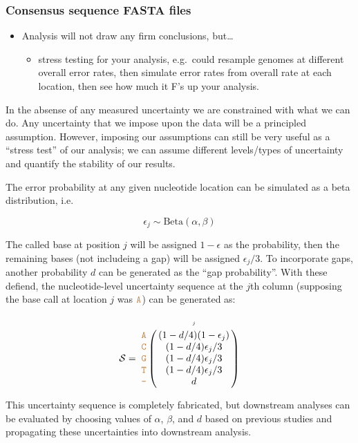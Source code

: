 \documentclass[
]{article}
\providecommand{\tightlist}{%
  \setlength{\itemsep}{0pt}\setlength{\parskip}{0pt}}
\newcommand{\sq}[1]{\texttt{\textcolor{brown}{#1}}}
\newcommand{\nps}{\mathcal{S}} %
\begin{document}
\hypertarget{consensus-sequence-fasta-files}{%
\subsubsection{Consensus sequence FASTA
files}\label{consensus-sequence-fasta-files}}

\begin{itemize}
\tightlist
\item
  Analysis will not draw any firm conclusions, but\ldots{}

  \begin{itemize}
  \tightlist
  \item
    stress testing for your analysis, e.g.~could resample genomes at
    different overall error rates, then simulate error rates from
    overall rate at each location, then see how much it F's up your
    analysis.
  \end{itemize}
\end{itemize}

In the absense of any measured uncertainty we are constrained with what
we can do. Any uncertainty that we impose upon the data will be a
principled assumption. However, imposing our assumptions can still be
very useful as a ``stress test'' of our analysis; we can assume
different levels/types of uncertainty and quantify the stability of our
results.

The error probability at any given nucleotide location can be simulated
as a beta distribution, i.e.~

\[
\epsilon_j \sim\text{Beta}(\alpha, \beta)
\]

The called base at position \(j\) will be assigned \(1- \epsilon\) as
the probability, then the remaining bases (not includeing a gap) will be
assigned \(\epsilon_j/3\). To incorporate gaps, another probability
\(d\) can be generated as the ``gap probability''. With these defiend,
the nucleotide-level uncertainty sequence at the \(j\)th column
(supposing the base call at location \(j\) was \(\sq{A}\)) can be
generated as:

\[
\nps = 
\bordermatrix{
&\scriptscriptstyle{j}  \cr
\sq{A} & (1 - d/4)(1-\epsilon_j) \cr
\sq{C} & (1 - d/4)\epsilon_j/3 \cr
\sq{G} & (1 - d/4)\epsilon_j/3 \cr
\sq{T} & (1 - d/4)\epsilon_j/3 \cr
\sq{-} & d \cr
}
\]

This uncertainty sequence is completely fabricated, but downstream
analyses can be evaluated by choosing values of \(\alpha\), \(\beta\),
and \(d\) based on previous studies and propagating these uncertainties
into downstream analysis.
\end{document}
